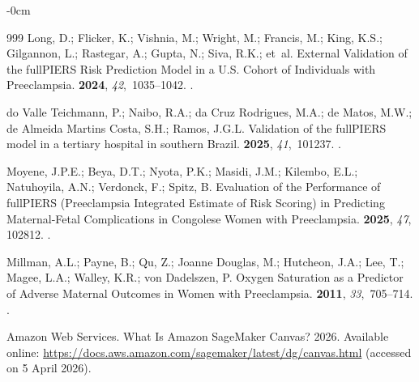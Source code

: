 \documentclass[diagnostics,article,accept,pdftex,moreauthors]{Definitions/mdpi}
\begin{document}
\begin{adjustwidth}{-\extralength}{0cm}
\begin{thebibliography}{999}
Long, D.; Flicker, K.; Vishnia, M.; Wright, M.; Francis, M.; King, K.S.;
  Gilgannon, L.; Rastegar, A.; Gupta, N.; Siva, R.K.;  et~al.
\newblock External Validation of the fullPIERS Risk Prediction Model in a U.S.
  Cohort of Individuals with Preeclampsia.
 {\bf 2024}, {\em
  42},~1035--1042.
.

{do Valle Teichmann}, P.; Naibo, R.A.; {da Cruz Rodrigues}, M.A.; {de Matos},
  M.W.; {de Almeida Martins Costa}, S.H.; Ramos, J.G.L.
\newblock Validation of the fullPIERS model in a tertiary hospital in southern
  Brazil.
 {\bf 2025}, {\em 41},~101237.
.

Moyene, J.P.E.; Beya, D.T.; Nyota, P.K.; Masidi, J.M.; Kilembo, E.L.;
  Natuhoyila, A.N.; Verdonck, F.; Spitz, B.
\newblock Evaluation of the Performance of fullPIERS (Preeclampsia Integrated
  Estimate of Risk Scoring) in Predicting Maternal-Fetal Complications in
  Congolese Women with Preeclampsia.
 {\bf 2025}, {\em
  47}, 102812.
.

Millman, A.L.; Payne, B.; Qu, Z.; {Joanne Douglas}, M.; Hutcheon, J.A.; Lee,
  T.; Magee, L.A.; Walley, K.R.; {von Dadelszen}, P.
\newblock Oxygen Saturation as a Predictor of Adverse Maternal Outcomes in
  Women with Preeclampsia.
 {\bf 2011}, {\em
  33},~705--714.
.

{Amazon Web Services}.
\newblock What Is Amazon SageMaker Canvas?  2026.
\newblock Available online: \url{https://docs.aws.amazon.com/sagemaker/latest/dg/canvas.html} {(accessed on 5 April 2026).} 



\end{thebibliography}
\end{adjustwidth}
\end{document}
